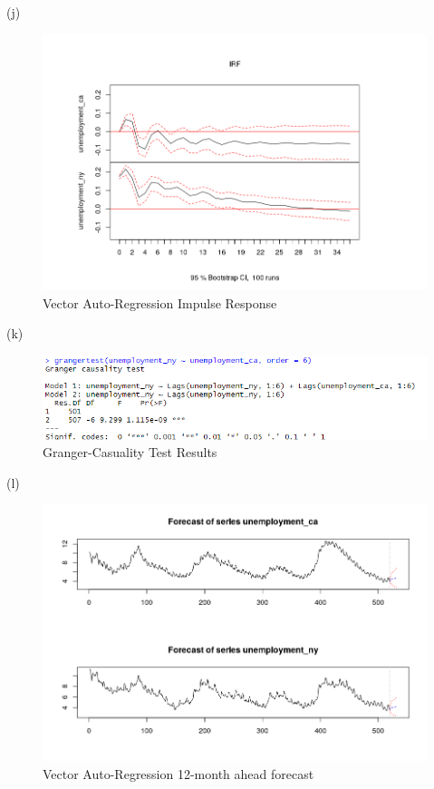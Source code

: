 \documentclass{article}
\begin{document}
\noindent (j)\begin{figure}[H]
	
	\includegraphics[width=\linewidth]{var_irf}
	\caption{Vector Auto-Regression Impulse Response} 
\end{figure}

\noindent (k) 
\begin{figure}[H]
	
	\includegraphics[width=\linewidth]{granger}
	\caption{Granger-Casuality Test Results} 
\end{figure}

\noindent (l)
\begin{figure}[H]
	
	\includegraphics[width=\linewidth]{var_forecast}
	\caption{Vector Auto-Regression 12-month ahead forecast} 
\end{figure}
\end{document}
